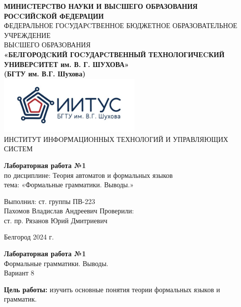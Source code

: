 \documentclass[a4paper,14pt]{extarticle}
\newcommand\textbox[1]{
	\parbox{.45\textwidth}{#1}
}
\begin{document}
\begin{center}
    \small{
        \textbf{МИНИCТЕРCТВО НАУКИ И ВЫCШЕГО ОБРАЗОВАНИЯ РОCCИЙCКОЙ ФЕДЕРАЦИИ}\\
        ФЕДЕРАЛЬНОЕ ГОCУДАРCТВЕННОЕ БЮДЖЕТНОЕ ОБРАЗОВАТЕЛЬНОЕ УЧРЕЖДЕНИЕ\\ВЫCШЕГО ОБРАЗОВАНИЯ \\
        \textbf{«БЕЛГОРОДCКИЙ ГОCУДАРCТВЕННЫЙ ТЕХНОЛОГИЧЕCКИЙ\\УНИВЕРCИТЕТ им. В. Г. ШУХОВА»\\ (БГТУ им. В.Г. Шухова)} \\
        \bigbreak
        \includegraphics[width=70mm]{log}\\
        ИНСТИТУТ ИНФОРМАЦИОННЫХ ТЕХНОЛОГИЙ И УПРАВЛЯЮЩИХ СИСТЕМ\\}
\end{center}

\vfill
\begin{center}
    \large{
        \textbf{
            Лабораторная работа №1}}\\
    \normalsize{
        по дисциплине: Теория автоматов и формальных языков \\
        тема: «Формальные грамматики. Выводы.»}
\end{center}
\vfill
\hfill\textbox{
    Выполнил: ст. группы ПВ-223\\Пахомов Владислав Андреевич
    \bigbreak
    Проверили: \\ст. пр. Рязанов Юрий Дмитриевич
}
\vfill\begin{center}
    Белгород 2024 г.
\end{center}
\newpage
\begin{center}
    \textbf{Лабораторная работа №1}\\
    Формальные грамматики. Выводы.\\
    Вариант 8
\end{center}
\textbf{Цель работы: }изучить основные понятия теории формальных языков и грамматик.
\end{document}
